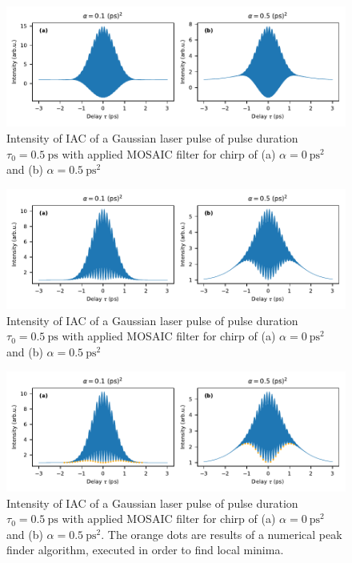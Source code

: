\begin{figure}[H]
	\centering
	\includegraphics[width=\linewidth]{figures/chirp/plots/I_M_gauss_chirp_without_slit_without_MOSAIC}
	\caption{Intensity of IAC of a Gaussian laser pulse of pulse duration $\tau_0=\SI{0.5}{\pico \second}$ with applied MOSAIC filter for chirp of (a) $\alpha = \SI{0}{\pico \second \squared}$ and (b) $\alpha = \SI{0.5}{\pico \second \squared}$}
	\label{fig:imgausschirpwithoutslitwithoutmosaic}
\end{figure}


\begin{figure}[H]
	\centering
	\includegraphics[width=\linewidth]{figures/chirp/plots/mosaic_chirped_laser_pulse}
	\caption{Intensity of IAC of a Gaussian laser pulse of pulse duration $\tau_0=\SI{0.5}{\pico \second}$ with applied MOSAIC filter for chirp of (a) $\alpha = \SI{0}{\pico \second \squared}$ and (b) $\alpha = \SI{0.5}{\pico \second \squared}$}
	\label{fig:mosaicchirpedlaserpulse}
\end{figure}

\begin{figure}[H]
	\centering
	\includegraphics[width=\linewidth]{figures/chirp/plots/mosaic_chirped_laser_pulse_find_envelope}
	\caption{Intensity of IAC of a Gaussian laser pulse of pulse duration $\tau_0=\SI{0.5}{\pico \second}$ with applied MOSAIC filter for chirp of (a) $\alpha = \SI{0}{\pico \second \squared}$ and (b) $\alpha = \SI{0.5}{\pico \second \squared}$.
	The orange dots are results of a numerical peak finder algorithm, executed in order to find local minima.}
	\label{fig:mosaicchirpedlaserpulsefindenvelope}
\end{figure}


